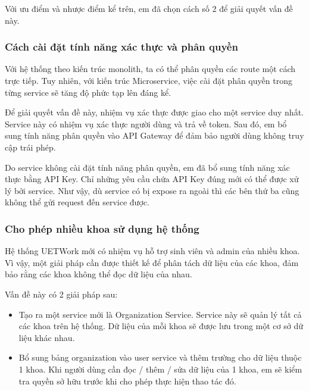 \documentclass[./../main.tex]{subfiles}
\begin{document}
Với ưu điểm và nhược điểm kể trên, em đã chọn cách số 2 để giải quyết
vấn đề này.

\hypertarget{cuxe1ch-cuxe0i-ux111ux1eb7t-tuxednh-nux103ng-xuxe1c-thux1ef1c-vuxe0-phuxe2n-quyux1ec1n}{%
	\subsubsection{Cách cài đặt tính năng xác thực và phân
		quyền}\label{cuxe1ch-cuxe0i-ux111ux1eb7t-tuxednh-nux103ng-xuxe1c-thux1ef1c-vuxe0-phuxe2n-quyux1ec1n}}

Với hệ thống theo kiến trúc monolith, ta có thể phân quyền các route một
cách trực tiếp. Tuy nhiên, với kiến trúc Microservice, việc cài đặt phân
quyền trong từng service sẽ tăng độ phức tạp lên đáng kể.

Để giải quyết vấn đề này, nhiệm vụ xác thực được giao cho một
service duy nhất. Service này có nhiệm vụ xác thực người dùng và trả về
token. Sau đó, em bổ sung tính năng phân quyền vào API Gateway để đảm
bảo người dùng không truy cập trái phép.

Do service không cài đặt tính năng phân quyền, em đã bổ sung tính năng
xác thực bằng API Key. Chỉ những yêu cầu chứa API Key đúng mới có thể
được xử lý bởi service. Như vậy, dù service có bị expose ra ngoài thì
các bên thứ ba cũng không thể gửi request đến service được.

\hypertarget{cho-phuxe9p-nhiux1ec1u-khoa-sux1eed-dux1ee5ng-hux1ec7-thux1ed1ng}{%
	\subsubsection{Cho phép nhiều khoa sử dụng hệ
		thống}\label{cho-phuxe9p-nhiux1ec1u-khoa-sux1eed-dux1ee5ng-hux1ec7-thux1ed1ng}}

Hệ thống UETWork mới có nhiệm vụ hỗ trợ sinh viên và admin của nhiều
khoa. Vì vậy, một giải pháp cần được thiết kế để phân tách dữ liệu của các
khoa, đảm bảo rằng các khoa không thể đọc dữ liệu của nhau.

Vấn đề này có 2 giải pháp sau:

\begin{itemize}
	\item

	      Tạo ra một service mới là Organization Service. Service này sẽ quản lý
	      tất cả các khoa trên hệ thống. Dữ liệu của mỗi khoa sẽ được lưu trong
	      một cơ sở dữ liệu khác nhau.

	\item

	      Bổ sung bảng organization vào user service và thêm trường
	       cho dữ liệu thuộc 1 khoa. Khi người dùng cần đọc /
	      thêm / sửa dữ liệu của 1 khoa, em sẽ kiểm tra quyền sở hữu trước khi
	      cho phép thực hiện thao tác đó.

\end{itemize}
\end{document}
